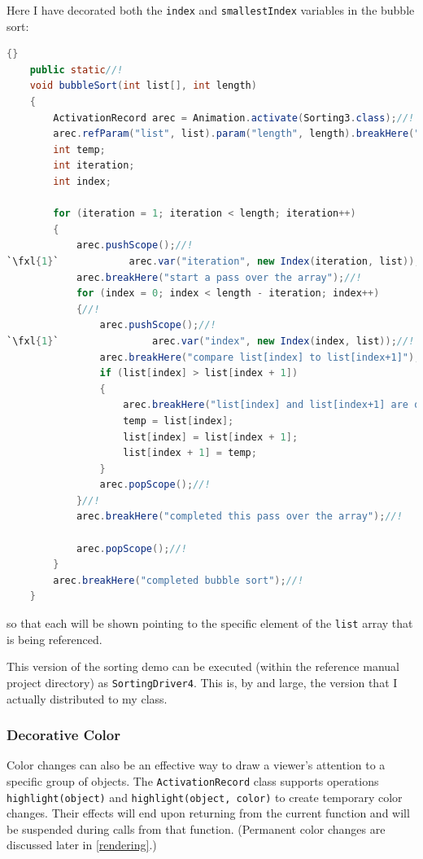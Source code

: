 \documentclass[11pt,titlepage]{book}
\def\fxl#1{%
\newdimen\fxlheight\setlength{\fxlheight}{#1\baselineskip}%
\advance\fxlheight by -0.5\baselineskip%
\begin{picture}(0,0)%
\setlength{\unitlength}{\baselineskip}%
\put(0,0){\makebox(0,0.75)[tl]{%
\colorbox{paleyellow}{%
\rule{0pt}{\fxlheight}%
\rule{\linewidth}{0pt}}%
}}\end{picture}%
}
\begin{document}
Here I have decorated both the {\tt index} and {\tt smallestIndex} variables in the bubble sort:
\begin{lstlisting}[language=Java,frame=tb]{}
    public static//!
    void bubbleSort(int list[], int length)
    {
        ActivationRecord arec = Animation.activate(Sorting3.class);//!
        arec.refParam("list", list).param("length", length).breakHere("starting bubble sort");//!
        int temp;
        int iteration;
        int index;

        for (iteration = 1; iteration < length; iteration++)
        {
            arec.pushScope();//!
`\fxl{1}`            arec.var("iteration", new Index(iteration, list));//!
            arec.breakHere("start a pass over the array");//!
            for (index = 0; index < length - iteration; index++)
            {//!
                arec.pushScope();//!
`\fxl{1}`                arec.var("index", new Index(index, list));//!
                arec.breakHere("compare list[index] to list[index+1]");//!
                if (list[index] > list[index + 1]) 
                {
                    arec.breakHere("list[index] and list[index+1] are out of order - swap them");//!
                    temp = list[index];
                    list[index] = list[index + 1];
                    list[index + 1] = temp;
                }
                arec.popScope();//!
            }//!
            arec.breakHere("completed this pass over the array");//!

            arec.popScope();//!
        }
        arec.breakHere("completed bubble sort");//!
    }
\end{lstlisting}
so that each will be shown pointing to the specific element of the {\tt list} array that is being referenced.


This version of the sorting demo can be executed (within the reference
manual project directory) as \texttt{SortingDriver4}. This is, by and large,
the version that I actually distributed to my class.


\subsubsection{Decorative Color}

Color changes can also be an effective way to draw a viewer's
attention to a specific group of objects.  The
\texttt{ActivationRecord} class supports operations {\tt
  highlight(object)} and {\tt highlight(object, color)} to create
temporary color changes. Their effects will end upon returning from
the current function and will be suspended during calls from that
function. (Permanent color changes are discussed later in
\autoref{rendering}.)
\end{document}
